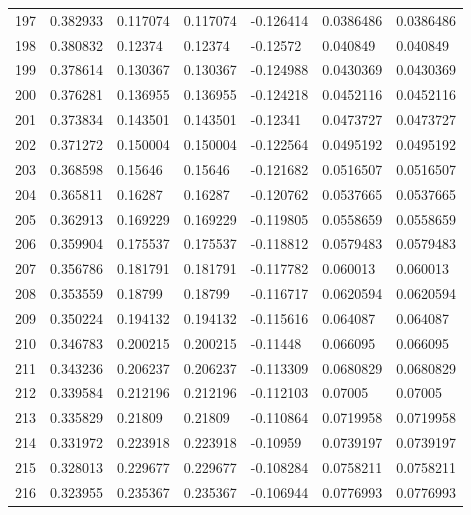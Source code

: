 \begin{longtable}{l|lll|lll}
 197 &  0.382933    & 0.117074    & 0.117074    & -0.126414    & 0.0386486   & 0.0386486   \\
 198 &  0.380832    & 0.12374     & 0.12374     & -0.12572     & 0.040849    & 0.040849    \\
 199 &  0.378614    & 0.130367    & 0.130367    & -0.124988    & 0.0430369   & 0.0430369   \\
 200 &  0.376281    & 0.136955    & 0.136955    & -0.124218    & 0.0452116   & 0.0452116   \\
 201 &  0.373834    & 0.143501    & 0.143501    & -0.12341     & 0.0473727   & 0.0473727   \\
 202 &  0.371272    & 0.150004    & 0.150004    & -0.122564    & 0.0495192   & 0.0495192   \\
 203 &  0.368598    & 0.15646     & 0.15646     & -0.121682    & 0.0516507   & 0.0516507   \\
 204 &  0.365811    & 0.16287     & 0.16287     & -0.120762    & 0.0537665   & 0.0537665   \\
 205 &  0.362913    & 0.169229    & 0.169229    & -0.119805    & 0.0558659   & 0.0558659   \\
 206 &  0.359904    & 0.175537    & 0.175537    & -0.118812    & 0.0579483   & 0.0579483   \\
 207 &  0.356786    & 0.181791    & 0.181791    & -0.117782    & 0.060013    & 0.060013    \\
 208 &  0.353559    & 0.18799     & 0.18799     & -0.116717    & 0.0620594   & 0.0620594   \\
 209 &  0.350224    & 0.194132    & 0.194132    & -0.115616    & 0.064087    & 0.064087    \\
 210 &  0.346783    & 0.200215    & 0.200215    & -0.11448     & 0.066095    & 0.066095    \\
 211 &  0.343236    & 0.206237    & 0.206237    & -0.113309    & 0.0680829   & 0.0680829   \\
 212 &  0.339584    & 0.212196    & 0.212196    & -0.112103    & 0.07005     & 0.07005     \\
 213 &  0.335829    & 0.21809     & 0.21809     & -0.110864    & 0.0719958   & 0.0719958   \\
 214 &  0.331972    & 0.223918    & 0.223918    & -0.10959     & 0.0739197   & 0.0739197   \\
 215 &  0.328013    & 0.229677    & 0.229677    & -0.108284    & 0.0758211   & 0.0758211   \\
 216 &  0.323955    & 0.235367    & 0.235367    & -0.106944    & 0.0776993   & 0.0776993   \\

\end{longtable}
